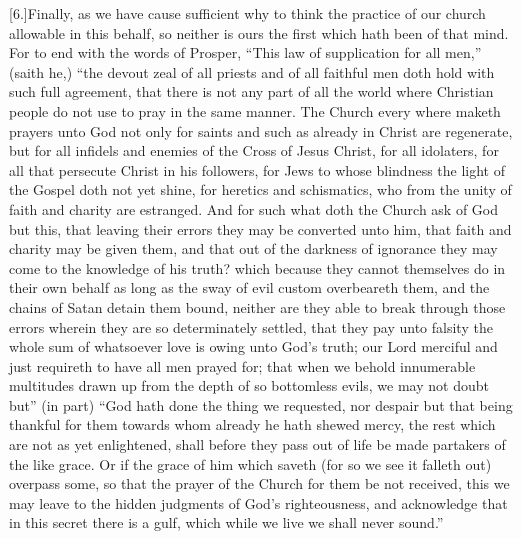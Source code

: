 [6.]Finally, as we have cause sufficient why to think the practice of our church allowable in this behalf, so neither is ours the first which hath been of that mind. For to end with the words of Prosper, “This law of supplication for all men,” (saith he,) “the devout zeal of all priests and of all faithful men doth hold with such full agreement, that there is not any part of all the world where Christian people do not use to pray in the same manner. The Church every where maketh prayers unto God not only for saints and such as  already in Christ are regenerate, but for all infidels and enemies of the Cross of Jesus Christ,
 for all idolaters, for all that persecute Christ in his followers, for Jews to whose blindness the light of the Gospel doth not yet shine, for heretics and schismatics, who from the unity of faith and charity are estranged. And for such what doth the Church ask of God but this, that leaving their errors they may be converted unto him, that faith and charity may be given them, and that out of the darkness of ignorance they may come to the knowledge of his truth? which because they cannot themselves do in their own behalf as long as the sway of evil custom overbeareth them, and the chains of Satan detain them bound, neither are they able to break through those errors wherein they are so determinately settled, that they pay unto falsity the whole sum of whatsoever love is owing unto God’s truth; our Lord merciful and just requireth to have all men prayed for; that when we behold innumerable multitudes drawn up from the depth of so bottomless evils, we may not doubt but” (in part) “God hath done the thing we requested, nor despair but that being thankful for them towards whom already he hath shewed mercy, the rest which are not as yet enlightened, shall before they pass out of life be made partakers of the like grace. Or if the grace of him which saveth (for so we see it falleth out) overpass some, so that the prayer of the Church for them be not received, this we may leave to the hidden judgments of God’s righteousness, and acknowledge that in this secret there is a gulf, which while we live we shall never sound.”




